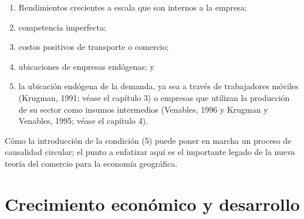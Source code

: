\begin{enumerate}
    \item Rendimientos crecientes a escala que son internos a la empresa; 
    \item competencia imperfecta;
    \item costos positivos de transporte o comercio; 
    \item ubicaciones de empresas endógenas; y 
    \item la ubicación endógena de la demanda, ya sea a través de trabajadores móviles (Krugman, 1991; véase el capítulo 3) o empresas que utilizan la producción de su sector como insumos intermedios (Venables, 1996 y Krugman y Venables, 1995; véase el capítulo 4).
\end{enumerate}

Cómo la introducción de la condición (5) puede poner en marcha un proceso de causalidad circular; el punto a enfatizar aquí es el importante legado de la nueva teoría del comercio para la economía geográfica. \\

\section{Crecimiento económico y desarrollo}

